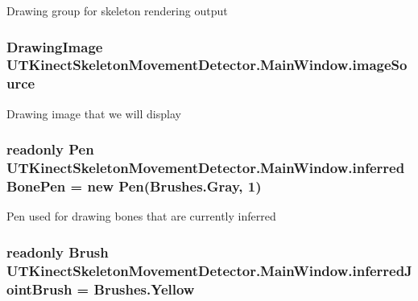 Drawing group for skeleton rendering output 

\hypertarget{classUTKinectSkeletonMovementDetector_1_1MainWindow_ad52ff16c5b6e893435ec7395a6c2d629}{
\subsubsection[{image\-Source}]{\setlength{\rightskip}{0pt plus 5cm}Drawing\-Image U\-T\-Kinect\-Skeleton\-Movement\-Detector.\-Main\-Window.\-image\-Source\hspace{0.3cm}{\ttfamily [private]}}}\label{classUTKinectSkeletonMovementDetector_1_1MainWindow_ad52ff16c5b6e893435ec7395a6c2d629}


Drawing image that we will display 

\hypertarget{classUTKinectSkeletonMovementDetector_1_1MainWindow_a93d63abebf74565cfd10da87ced63146}{
\subsubsection[{inferred\-Bone\-Pen}]{\setlength{\rightskip}{0pt plus 5cm}readonly Pen U\-T\-Kinect\-Skeleton\-Movement\-Detector.\-Main\-Window.\-inferred\-Bone\-Pen = new Pen(Brushes.\-Gray, 1)\hspace{0.3cm}{\ttfamily [private]}}}\label{classUTKinectSkeletonMovementDetector_1_1MainWindow_a93d63abebf74565cfd10da87ced63146}


Pen used for drawing bones that are currently inferred 

\hypertarget{classUTKinectSkeletonMovementDetector_1_1MainWindow_a31afb96aa9574c7c64153506a5a1cc3e}{
\subsubsection[{inferred\-Joint\-Brush}]{\setlength{\rightskip}{0pt plus 5cm}readonly Brush U\-T\-Kinect\-Skeleton\-Movement\-Detector.\-Main\-Window.\-inferred\-Joint\-Brush = Brushes.\-Yellow\hspace{0.3cm}{\ttfamily [private]}}}\label{classUTKinectSkeletonMovementDetector_1_1MainWindow_a31afb96aa9574c7c64153506a5a1cc3e}


